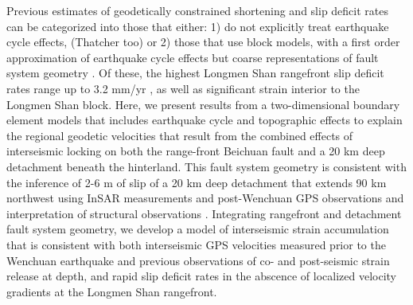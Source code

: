 \documentclass[12pt]{article}
\begin{document}
Previous estimates of geodetically constrained shortening and slip deficit rates can be categorized into those that either: 1) do not explicitly treat earthquake cycle effects, \citep{chen00, shen05} (Thatcher too) or 2) those that use block models, with a first order approximation of earthquake cycle effects but coarse representations of fault system geometry \citep{Meade07c, Loveless2011, Burchfiel2008a}. Of these, the highest Longmen Shan rangefront slip deficit rates range up to 3.2 mm/yr \citep{Loveless2011}, as well as significant strain interior to the Longmen Shan block. Here, we present results from a two-dimensional boundary element models that includes earthquake cycle and topographic effects to explain the regional geodetic velocities that result from the combined effects of interseismic locking on both the range-front Beichuan fault and a 20 km deep detachment beneath the hinterland.  This fault system geometry is consistent with the inference of 2-6 m of slip of a 20 km deep detachment that extends 90 km northwest using InSAR measurements and post-Wenchuan GPS observations \citep{Qi2011, Fielding2013b} and interpretation of structural observations \citep{Hubbard2010, Li2010}. Integrating rangefront and detachment fault system geometry, we develop a model of interseismic strain accumulation that is consistent with both interseismic GPS velocities measured prior to the Wenchuan earthquake and previous observations of co- and post-seismic strain release at depth, and rapid slip deficit rates in the abscence of localized velocity gradients at the Longmen Shan rangefront.
\end{document}

